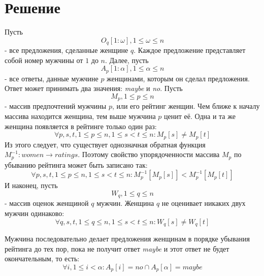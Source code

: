 \documentclass{article}
\author{Виталий Кирсанов}
\begin{document}
\section{Решение}

Пусть 
\begin{displaymath}
O_q[1:\omega], 1 \leq \omega \leq n 
\end{displaymath}
- все предложения, сделанные женщине \( q \). Каждое предложение представляет собой номер мужчины от \( 1 \) до \( n \). Далее, пусть
\begin{displaymath}
A_p[1:\alpha], 1 \leq \alpha \leq n 
\end{displaymath}
- все ответы, данные мужчине \( p \) женщинами, которым он сделал предложения. Ответ может принимать два значения: \emph{maybe} и \emph{no}.
Пусть
\begin{displaymath}
M_p, 1 \leq p \leq n
\end{displaymath}
- массив предпочтений мужчины \( p \), или его рейтинг женщин. Чем ближе к началу массива находится женщина, тем выше мужчина \( p \) ценит её. Одна
и та же женщина появляется в рейтинге только один раз:
\begin{displaymath}
\forall p,s,t, 1 \leq p \leq n, 1 \leq s < t \leq n : M_p[s] \neq M_p[t]
\end{displaymath}
Из этого следует, что существует однозначная обратная функция \( M_p^{-1} : women \to ratings \). Поэтому свойство упорядоченности массива \( M_p \) по
убыванию рейтинга может быть записано так:
\begin{displaymath}
\forall p,s,t, 1 \leq p \leq n, 1 \leq s < t \leq n : M_p^{-1}[M_p[s]] < M_p^{-1}[M_p[t]]
\end{displaymath}
И наконец, пусть
\begin{displaymath}
W_q, 1 \leq q \leq n
\end{displaymath}
- массив оценок женщиной \( q \) мужчин. Женщина \( q \) не оценивает никаких двух мужчин одинаково:
\begin{displaymath}
\forall q,s,t, 1 \leq q \leq n, 1 \leq s < t \leq n : W_q[s] \neq W_q[t]
\end{displaymath}

Мужчина последовательно делает предложения женщинам в порядке убывания рейтинга до тех пор, пока не получит ответ \emph{maybe} и этот ответ не
будет окончательным, то есть:
\begin{displaymath}
\forall i, 1 \leq i < \alpha : A_p[i] = no \cap A_p[\alpha] = maybe
\end{displaymath}
\end{document}
